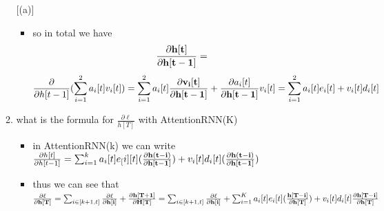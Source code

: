 \documentclass{article}
\begin{document}
\begin{enumerate}[(a)]
\begin{enumerate} [(a)]
\begin{itemize}
            \item so in total we have $$\frac{\partial \bold{h[t]}}{\partial \bold{h[t-1]}}=$$ $$\frac{\partial }{\partial h[t-1]}(\sum_{i=1}^{2}a_{i}[t]v_{i}[t])=\sum_{i=1}^{2}a_{i}[t]\frac{\partial \bold{v_i[t]}}{\partial \bold{h[t-1]}}+\frac{\partial {a_i[t]}}{\partial \bold{h[t-1]}}v_i[t]=\sum_{i=1}^{2}a_{i}[t]e_i[t]+v_i[t]d_i[t]$$
        \end{itemize}
        \item what is the formula for $\frac{\partial \ell }{h[T]}$ with AttentionRNN(K)
        \begin{itemize}
            \color{blue}
            \item in AttentionRNN(k) we can write $\frac{\partial h[t]}{\partial h[t-1]}=\sum_{i=1}^{k}a_{i}[t]e_[i][t](\frac{\partial \bold{h(t-i)}}{\partial \bold{h[t-1]}})+v_{i}[t]d_{i}[t](\frac{\partial \bold{h(t-i)}}{\partial \bold{h[t-1]}})$
            \item thus we can see that $\frac{\partial \ell}{\partial \bold{h[T]}}=\sum_{i\in[k+1, t]}\frac{\partial \ell}{\partial \bold{h[i]}}+\frac{\partial \bold{h[T+1]}}{\partial \bold{H[T]}}=\sum_{i\in[k+1, t]}\frac{\partial \ell}{\partial \bold{h[i]}}+\sum_{i=1}^{K}a_{i}[t]e_{i}[t](\frac{\bold{h[T-i]}}{\partial \bold{h[T]}})+v_{i}[t]d_{i}[t]\frac{\partial \bold{h[T-i]}}{\partial \bold{h[T]}}$
        \end{itemize}
    
    \end{enumerate}
\end{enumerate}
\end{document}
